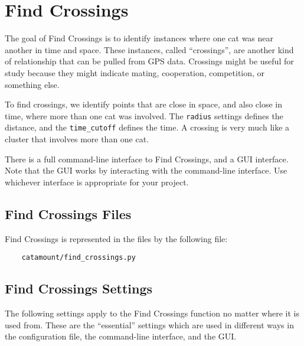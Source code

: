 \chapter{Find Crossings}
\hypertarget{find-crossings}{}

The goal of Find Crossings is to identify instances where one cat was
near another in time and space. These instances, called ``crossings'',
are another kind of relationship that can be pulled from GPS data.
Crossings might be useful for study because they might indicate
mating, cooperation, competition, or something else.

To find crossings, we identify points that are close in space, and
also close in time, where more than one cat was involved. The
\texttt{radius} settings defines the distance, and the
\texttt{time\_cutoff} defines the time. A crossing is very much like a
cluster that involves more than one cat.

There is a full command-line interface to Find Crossings, and a GUI
interface. Note that the GUI works by interacting with the command-line
interface. Use whichever interface is appropriate for your project.

\section{Find Crossings Files}

Find Crossings is represented in the files by the following file:

\begin{verbatim}
    catamount/find_crossings.py
\end{verbatim}

\section{Find Crossings Settings}
\hypertarget{crossing-settings}{}

The following settings apply to the Find Crossings function no matter
where it is used from. These are the ``essential'' settings which are
used in different ways in the configuration file, the command-line
interface, and the GUI.

